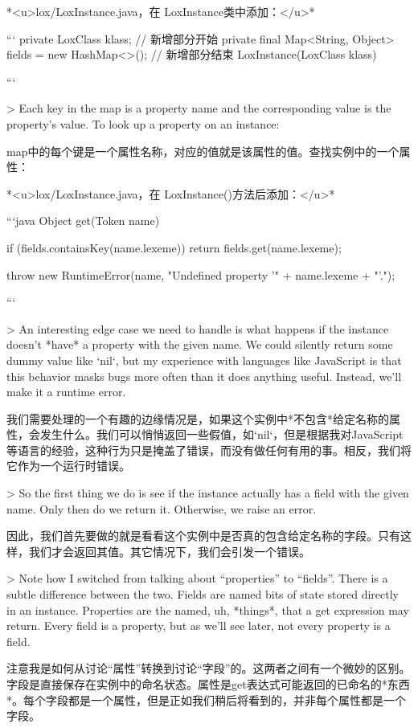\documentclass[cn,11pt,chinese]{elegantbook}
\begin{document}
{{{{{{{{{{{{{{{{{{{{*<u>lox/LoxInstance.java，在 LoxInstance类中添加：</u>*

```
  private LoxClass klass;
  // 新增部分开始
  private final Map<String, Object> fields = new HashMap<>();
  // 新增部分结束
  LoxInstance(LoxClass klass) {
```

> Each key in the map is a property name and the corresponding value is the property’s value. To look up a property on an instance:

map中的每个键是一个属性名称，对应的值就是该属性的值。查找实例中的一个属性：

*<u>lox/LoxInstance.java，在 LoxInstance()方法后添加：</u>*

```java
  Object get(Token name) {
    if (fields.containsKey(name.lexeme)) {
      return fields.get(name.lexeme);
    }

    throw new RuntimeError(name, 
        "Undefined property '" + name.lexeme + "'.");
  }
```

> An interesting edge case we need to handle is what happens if the instance doesn’t *have* a property with the given name. We could silently return some dummy value like `nil`, but my experience with languages like JavaScript is that this behavior masks bugs more often than it does anything useful. Instead, we’ll make it a runtime error.

我们需要处理的一个有趣的边缘情况是，如果这个实例中*不包含*给定名称的属性，会发生什么。我们可以悄悄返回一些假值，如`nil`，但是根据我对JavaScript等语言的经验，这种行为只是掩盖了错误，而没有做任何有用的事。相反，我们将它作为一个运行时错误。

> So the first thing we do is see if the instance actually has a field with the given name. Only then do we return it. Otherwise, we raise an error.

因此，我们首先要做的就是看看这个实例中是否真的包含给定名称的字段。只有这样，我们才会返回其值。其它情况下，我们会引发一个错误。

> Note how I switched from talking about “properties” to “fields”. There is a subtle difference between the two. Fields are named bits of state stored directly in an instance. Properties are the named, uh, *things*, that a get expression may return. Every field is a property, but as we’ll see later, not every property is a field.

注意我是如何从讨论“属性”转换到讨论“字段”的。这两者之间有一个微妙的区别。字段是直接保存在实例中的命名状态。属性是get表达式可能返回的已命名的*东西*。每个字段都是一个属性，但是正如我们稍后将看到的，并非每个属性都是一个字段。

}}}}}}}}}}}}}}}}}}}}}
\end{document}
